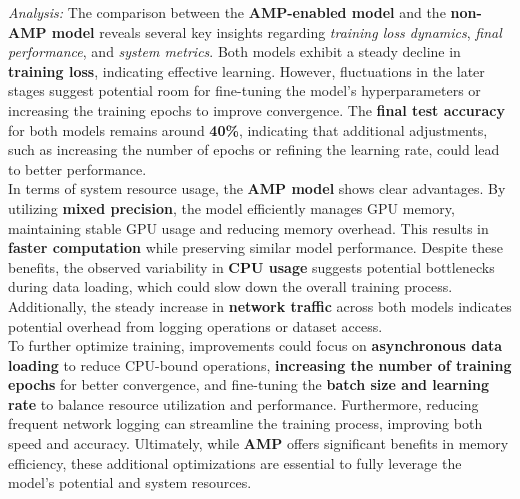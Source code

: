 \documentclass[11pt, oneside]{article}   	%
\begin{document}
\textit{Analysis: }
The comparison between the \textbf{AMP-enabled model} and the \textbf{non-AMP model} reveals several key insights regarding \textit{training loss dynamics}, \textit{final performance}, and \textit{system metrics}. Both models exhibit a steady decline in \textbf{training loss}, indicating effective learning. However, fluctuations in the later stages suggest potential room for fine-tuning the model's hyperparameters or increasing the training epochs to improve convergence. The \textbf{final test accuracy} for both models remains around \textbf{40\%}, indicating that additional adjustments, such as increasing the number of epochs or refining the learning rate, could lead to better performance.
\\
In terms of system resource usage, the \textbf{AMP model} shows clear advantages. By utilizing \textbf{mixed precision}, the model efficiently manages GPU memory, maintaining stable GPU usage and reducing memory overhead. This results in \textbf{faster computation} while preserving similar model performance. Despite these benefits, the observed variability in \textbf{CPU usage} suggests potential bottlenecks during data loading, which could slow down the overall training process. Additionally, the steady increase in \textbf{network traffic} across both models indicates potential overhead from logging operations or dataset access.
\\
To further optimize training, improvements could focus on \textbf{asynchronous data loading} to reduce CPU-bound operations, \textbf{increasing the number of training epochs} for better convergence, and fine-tuning the \textbf{batch size and learning rate} to balance resource utilization and performance. Furthermore, reducing frequent network logging can streamline the training process, improving both speed and accuracy. Ultimately, while \textbf{AMP} offers significant benefits in memory efficiency, these additional optimizations are essential to fully leverage the model's potential and system resources.
\end{document}
